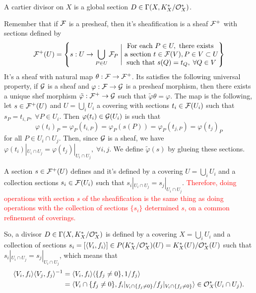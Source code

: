 \begin{dang}
    \begin{definition}
        A cartier divisor on $X$ is a global section $D\in \Gamma(X,K_X^*/\mathcal{O}_X^*)$.
    \end{definition}
\end{dang}
Remember that if $\mathcal{F}$ is a presheaf, then it's sheafification is a sheaf $\mathcal{F}^+$ with sections defined by 
\begin{equation}
    \mathcal{F}^+(U)=\left\{s:U\to \bigcup_{P\in U}\mathcal{F}_P\;\Bigg|\; \begin{matrix}
    \text{For each  }P\in U,\text{ there exists }\\
    \text{a section }t\in\mathcal{F}(V), P\in V\subset U\\
    \text{such that }s(Q)=t_Q,\;\forall Q\in V
    \end{matrix}\right\}
\end{equation}
It's a sheaf with natural map $\theta:\mathcal{F}\to \mathcal{F}^+$. Its satisfies the following universal property, if 
$\mathcal{G}$ is a sheaf and $\varphi:\mathcal{F}\to\mathcal{G}$ is a presheaf morphism, then there exists a unique 
shef morphism $\tilde{\varphi}:\mathcal{F}^+\to \mathcal{G}$ such that $\tilde{\varphi}\theta=\varphi$. The map is the following, let 
$s\in \mathcal{F}^+(U)$ and $U=\bigcup_i U_i$ a covering with sections 
$t_i\in \mathcal{F}(U_i)$ such that $s_P = t_{i,P},\;\forall P\in U_i$. Then $\varphi(t_i)\in\mathcal{G}(U_i)$ is such that 
\begin{equation}
    \varphi(t_i)_P = \varphi_P(t_{i,P})=\varphi_P(s(P))=\varphi_P(t_{j,P}) =\varphi(t_j)_P
\end{equation}
for all $P\in U_i\cap U_j$. Then, since $\mathcal{G}$ is a sheaf, we have 
$\varphi(t_i)|_{U_i\cap U_j}=\varphi(t_j)|_{U_i\cap U_j},\;\forall i,j$. We define $\tilde{\varphi}(s)$ 
by glueing these sections.

\begin{remark}
    A section $s\in\mathcal{F}^+(U)$ defines and it's defined by a covering $U=\bigcup_iU_i$ 
    and a collection sections $s_i\in \mathcal{F}(U_i)$ such that $s_i|_{U_i\cap U_j}=s_j|_{U_i\cap U_j}$. 
    \textcolor{red}{Therefore, doing operations with section $s$ of the sheafification is the same 
    thing as doing operations with the collection of sections $\{s_i\}$ determined $s$, 
    on a common refinement of coverings.}
\end{remark}

So, a divisor $D\in\Gamma(X, K_X^*/\mathcal{O}_X^*)$ is defined by a covering $X=\bigcup_iU_i$ 
and a collection of sections $s_i = [\langle V_i,f_i\rangle]\in P(K_X^*/\mathcal{O}_X^*)(U)=K_X^*(U)/\mathcal{O}_X^*(U)$
such that $s_i|_{U_i\cap U_j}=s_j|_{U_i\cap U_j}$, which means that 
\begin{equation}
    \begin{split}
        \langle V_i, f_i\rangle \langle V_j, f_j\rangle^{-1}&=
        \langle V_i ,f_i\rangle\langle \{f_j\neq0\},1/f_j\rangle\\
        &=\langle V_i\cap\{f_j\neq0\}, f_i|_{V_i\cap \{f_j\neq0\}}/f_j|_{V_i\cap\{f_j\neq0\}}\rangle\in\mathcal{O}_X^*(U_i\cap U_j).
    \end{split}
\end{equation}

